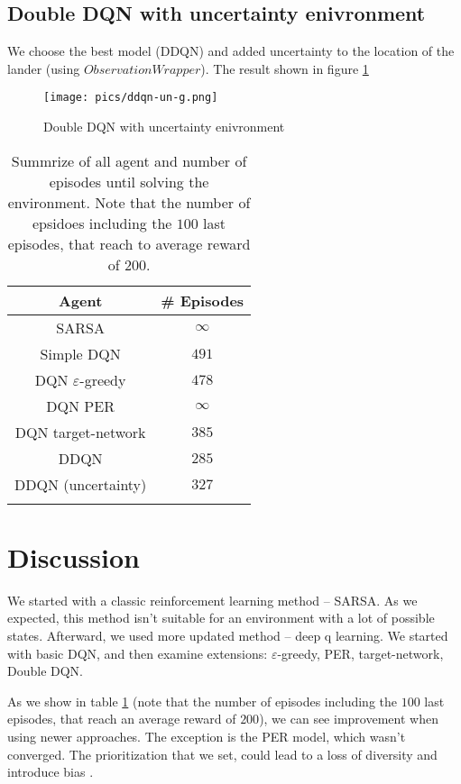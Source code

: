 \documentclass{article}
\begin{document}
	\subsection{Double DQN with uncertainty enivronment}
	We choose the best model (DDQN) and added uncertainty to the location of the lander (using $ ObservationWrapper $). The result shown in figure \ref{ddqn-un}
	\begin{figure}[]
		\begin{center}
			\texttt{[image: pics/ddqn-un-g.png]}
		\end{center}
		\caption{Double DQN with uncertainty enivronment}
		\label{ddqn-un}
	\end{figure}
	\begin{table}[]
		\centering
		\begin{tabular}{@{}cc@{}}
			\toprule
			Agent                    & \# Episodes \\ \midrule
			SARSA                    & $\infty$  \\
			Simple DQN               & $491$       \\
			DQN $\varepsilon$-greedy & $478$       \\
			DQN PER                  & $\infty$ \\
			DQN target-network       & $385$       \\
			DDQN                     & $285$       \\
			DDQN (uncertainty)       & $327$       \\  \bottomrule \\
		\end{tabular}
		\caption{Summrize of all agent and number of episodes until solving the environment. Note that the number of epsidoes including the $ 100 $ last episodes, that reach to average reward of $ 200 $.}
		\label{result}
	\end{table}
	
	\newpage
	\section{Discussion}
	We started with a classic reinforcement learning method -- SARSA. As we expected, this method isn't suitable for an environment with a lot of possible states. Afterward, we used more updated method -- deep q learning. We started with basic DQN, and then examine extensions:  $ \varepsilon $-greedy, PER, target-network,  Double DQN.
	
	As we show in table \ref{result} (note that the number of episodes including the $ 100 $ last episodes, that reach an average reward of $ 200 $), we can see improvement when using newer approaches. The exception is the PER model, which wasn't converged. The prioritization that we set, could lead to a loss of diversity and introduce bias \cite{schaul2015prioritized}. 
	
\end{document}
